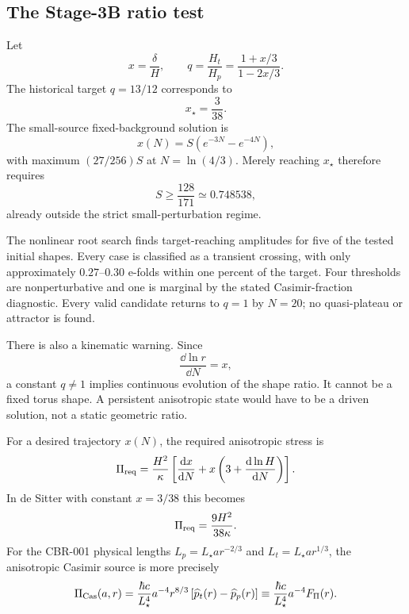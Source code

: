 \subsection{The Stage-3B ratio test}

Let
\begin{equation}
 x=\frac{\delta}{H},
 \qquad
 q=\frac{H_t}{H_p}=\frac{1+x/3}{1-2x/3}.
 \label{eq:q-x}
\end{equation}
The historical target $q=13/12$ corresponds to
\begin{equation}
 x_\star=\frac{3}{38}.
\end{equation}
The small-source fixed-background solution is
\begin{equation}
 x(N)=S\left(e^{-3N}-e^{-4N}\right),
\end{equation}
with maximum $(27/256)S$ at $N=\ln(4/3)$.  Merely reaching $x_\star$ therefore
requires
\begin{equation}
 S\ge\frac{128}{171}\simeq0.748538,
\end{equation}
already outside the strict small-perturbation regime.

The nonlinear root search finds target-reaching amplitudes for five of the
tested initial shapes.  Every case is classified as a transient crossing,
with only approximately $0.27$--$0.30$ e-folds within one percent of the
target.  Four thresholds are nonperturbative and one is marginal by the stated
Casimir-fraction diagnostic.  Every valid candidate returns to $q=1$ by
$N=20$; no quasi-plateau or attractor is found.

There is also a kinematic warning.  Since
\begin{equation}
 \frac{\dd\ln r}{\dd N}=x,
\end{equation}
a constant $q\ne1$ implies continuous evolution of the shape ratio.  It cannot
be a fixed torus shape.  A persistent anisotropic state would have to be a
driven solution, not a static geometric ratio.

For a desired trajectory $x(N)$, the required anisotropic stress is
\begin{equation}
 \Pi_{\rm req}=\frac{H^2}{\kappa}
 \left[\frac{\mathrm d x}{\mathrm d N}
 +x\left(3+\frac{\mathrm d\ln H}{\mathrm d N}\right)\right].
 \label{eq:required-pi}
\end{equation}
In de Sitter with constant $x=3/38$ this becomes
\begin{equation}
 \Pi_{\rm req}=\frac{9H^2}{38\kappa}.
\end{equation}
For the CBR-001 physical lengths
$L_p=L_\star a r^{-2/3}$ and $L_t=L_\star a r^{1/3}$, the anisotropic Casimir
source is more precisely
\begin{equation}
 \Pi_{\rm Cas}(a,r)=\frac{\hbar c}{L_\star^4}a^{-4}
 r^{8/3}\left[\widehat p_t(r)-\widehat p_p(r)\right]
 \equiv\frac{\hbar c}{L_\star^4}a^{-4}F_\Pi(r).
 \label{eq:casimir-pi-scaling}
\end{equation}
